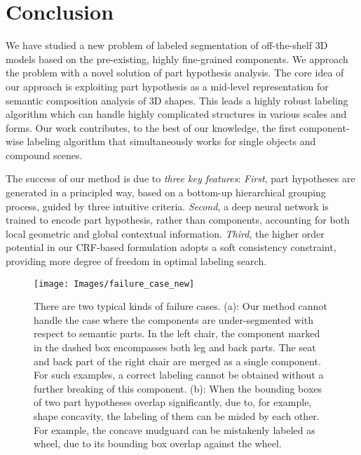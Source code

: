 \documentclass[acmtog]{acmart}
\newcommand{\new}[1]{{\color{black}#1}}
\newcommand{\wang}[1]{{\color{black}#1}}
\begin{document}
\section{Conclusion}
\new{We have studied a new problem of labeled segmentation of off-the-shelf
3D models based on the pre-existing, highly fine-grained
components. We approach the problem with a novel solution
of part hypothesis analysis.
The core idea of our approach is exploiting part hypothesis as a mid-level representation
for semantic composition analysis of 3D shapes.
This leads a highly robust labeling algorithm which can handle highly complicated structures
in various scales and forms.
Our work contributes, to the best of our knowledge, the first component-wise labeling algorithm
that simultaneously works for single objects and compound scenes.

\new{
The success of our method is due to \emph{three key features}:
\emph{First}, part hypotheses are generated in a principled way, based on a bottom-up
hierarchical grouping process, guided by three intuitive criteria.
\emph{Second}, a deep neural network is trained to encode part hypothesis, rather than components,
accounting for both local geometric and global contextual information.
\emph{Third}, the higher order potential in our CRF-based formulation adopts a soft consistency
constraint, providing more degree of freedom in optimal labeling search.
}

\begin{figure}[t]
  \centering
  \texttt{[image: Images/failure\_case\_new]}
  \caption{\wang{There are two typical kinds of failure cases.
  (a):
  Our method cannot handle the case where the components are under-segmented with respect to semantic parts.
  In the left chair, the component marked in the dashed box encompasses both leg and back parts. The seat and back part of the right chair are merged as a single component. For such examples, a correct labeling cannot be obtained without a further breaking of this component.
  (b):
  When the bounding boxes of two part hypotheses overlap significantly, due to, for example, shape concavity, the labeling of them can be misled by each other. For example, the concave mudguard can be mistakenly labeled as wheel, due to its bounding box overlap against the wheel.}}
  \label{fig:failure}
\end{figure}

}
\end{document}
